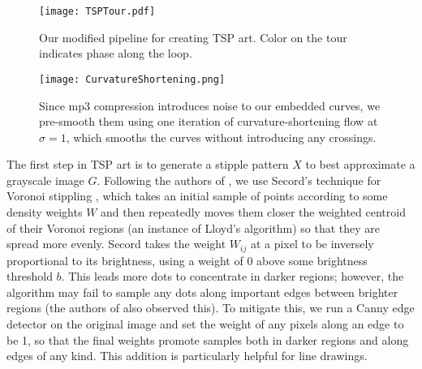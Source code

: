 \documentclass[runningheads]{llncs}
\begin{document}
\begin{figure}
  \centering
  \texttt{[image: TSPTour.pdf]}
  \caption{Our modified pipeline for creating TSP art.  Color on the tour indicates phase along the loop.}
  \label{fig:TSPTour}
\end{figure}

\begin{figure}
  \begin{minipage}[c]{0.4\textwidth}
    \caption{
      Since mp3 compression introduces noise to our embedded curves, we pre-smooth them using one iteration of curvature-shortening flow at $\sigma=1$, which smooths the curves without introducing any crossings.
    } \label{fig:CurvatureShortening}
  \end{minipage}
  \begin{minipage}[c]{0.6\textwidth}
    \texttt{[image: CurvatureShortening.png]}
  \end{minipage}\hfill
\end{figure}

The first step in TSP art is to generate a stipple pattern $X$ to best approximate a grayscale image $G$.  Following the authors of \cite{kaplan2005tsp}, we use Secord's technique for Voronoi stippling \cite{secord2002weighted}, which takes an initial sample of points according to some density weights $W$ and then repeatedly moves them closer the weighted centroid of their Voronoi regions (an instance of Lloyd's algorithm) so that they are spread more evenly.  Secord \cite{secord2002weighted} takes the weight $W_{ij}$ at a pixel to be inversely proportional to its brightness, using a weight of $0$ above some brightness threshold $b$.  This leads more dots to concentrate in darker regions; however, the algorithm may fail to sample any dots along important edges between brighter regions (the authors of \cite{li2011structure} also observed this).  To mitigate this, we run a Canny edge detector \cite{canny1986computational} on the original image and set the weight of any pixels along an edge to be 1, so that the final weights promote samples both in darker regions and along edges of any kind.  This addition is particularly helpful for line drawings.  %
\end{document}
